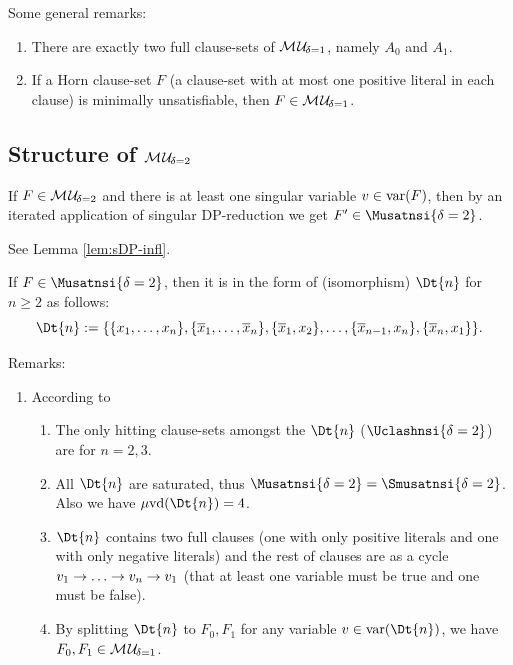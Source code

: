 \documentclass{report}
\begin{document}
Some general remarks: 
  \begin{enumerate}
  \item There are exactly two full clause-sets of $\mathcal{M\hspace{0.8pt}U}_{\!\delta=1}$, namely $A_0$ and $A_1$.
  \item If a Horn clause-set $F$ (a clause-set with at most one positive literal in each clause) is minimally unsatisfiable, then $F \in \mathcal{M\hspace{0.8pt}U}_{\!\delta=1}$.
  \end{enumerate} 
\subsection{Structure of $\mathcal{M\hspace{0.8pt}U}_{\!\delta=2}$}
\label{sec:smu2}

\begin{lem}\label{lem:mu2-mup}
If $F \in \mathcal{M\hspace{0.8pt}U}_{\!\delta=2}$ and there is at least one singular variable $v \in \operatorname{var}(F)$, then by an iterated application of singular DP-reduction we get $F' \in \Musatnsi{\delta=2}$.
\end{lem}
\begin{prf}
See Lemma \ref{lem:sDP-infl}.
\end{prf}

\begin{lem}\label{lem:mu2-Fn}
\cite{KleineBuening2000SubclassesMU} If $F \in \Musatnsi{\delta=2}$, then it is in the form of (isomorphism) $\Dt{n}$  for $n \ge 2$ as follows:
  \begin{displaymath}
    \Dt{n} := \set{\set{x_1,\dots,x_n},\set{\ol x_1,\dots,\ol x_n},\set{\ol x_1,x_2}, \dots, \set{\ol x_{n-1},x_n}, \set{\ol x_n,x_1}}.
  \end{displaymath}

\end{lem}
Remarks:
  \begin{enumerate}
  \item According to \cite{KullmannZhao2010Extremal}
  \begin{enumerate}
  \item The only hitting clause-sets amongst the $\Dt{n}$ ($\Uclashnsi{\delta=2}$) are for $n=2,3$. 
  \item All $\Dt{n}$ are saturated, thus $\Musatnsi{\delta=2} = \Smusatnsi{\delta=2}$. Also we have $\minvdeg(\Dt{n}) = 4$. 
  \item $\Dt{n}$ contains two full clauses (one with only positive literals and one with only negative literals) and the rest of clauses are as a cycle $v_1 \ra \dots \ra v_n \ra v_1$ (that at least one variable must be true and one must be false).
  \item By splitting $\Dt{n}$ to $F_0, F_1$ for any variable $v \in \var(\Dt{n})$, we have $F_0, F_1 \in \mathcal{M\hspace{0.8pt}U}_{\!\delta=1} $.
  \end{enumerate} 
  \end{enumerate} 
  
\end{document}
